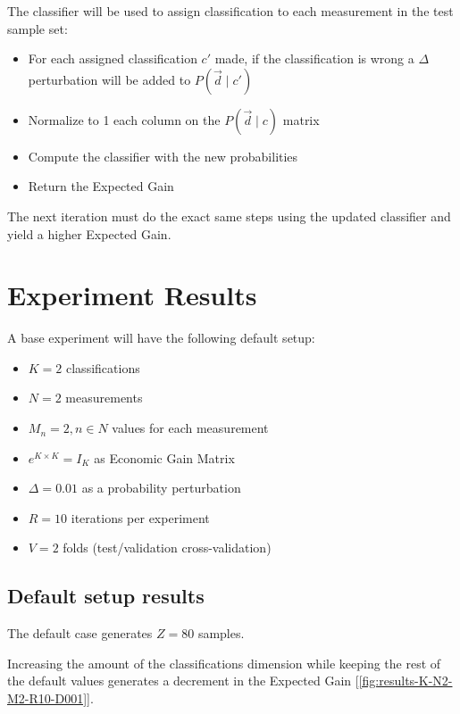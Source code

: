 \documentclass[letterpaper, conference]{IEEEtran}
\begin{document}
The classifier will be used to assign classification to each measurement in the test sample set:

\begin{itemize}
  \item For each assigned classification $c'$ made, if the classification is wrong a $\Delta$ perturbation will be added to $P(\vec{d} \mid c')$
  \item Normalize to 1 each column on the $P(\vec{d} \mid c)$ matrix
  \item Compute the classifier with the new probabilities
  \item Return the Expected Gain
\end{itemize}

The next iteration must do the exact same steps using the updated classifier and yield a higher Expected Gain.

\section{Experiment Results}

A base experiment will have the following default setup:

\begin{itemize}
  \item $K = 2$ classifications
  \item $N = 2$ measurements
  \item $M_n = 2, n \in N$ values for each measurement
  \item $e^{K \times K} = I_K$ as Economic Gain Matrix
  \item $\Delta = 0.01$ as a probability perturbation
  \item $R = 10$ iterations per experiment
  \item $V = 2$ folds (test/validation cross-validation)
\end{itemize}

\subsection{Default setup results}

The default case generates $Z = 80$ samples. 

Increasing the amount of the classifications dimension while keeping the rest of the default values generates a decrement in the Expected Gain [\ref{fig:results-K-N2-M2-R10-D001}].


\end{document}
